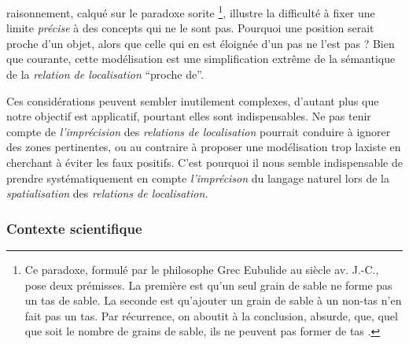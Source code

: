 raisonnement, calqué sur le paradoxe sorite \footnote{Ce paradoxe,
  formulé par le philosophe Grec Eubulide au  siècle
  av. J.-C., pose deux prémisses. La première est qu'un seul grain de
  sable ne forme pas un tas de sable. La seconde est qu'ajouter un
  grain de sable à un non-tas n'en fait pas un tas. Par récurrence, on
  aboutit à la conclusion, absurde, que, quel que soit le nombre de
  grains de sable, ils ne peuvent pas former de tas
  \autocite{Sorensen2018,Hyde2018}.}, illustre la difficulté à fixer
une limite \emph{précise} à des concepts qui ne le sont pas. Pourquoi
une position serait proche d'un objet, alors que celle qui en est
éloignée d'un pas ne l'est pas ? Bien que courante, cette modélisation
est une simplification extrême de la sémantique de la \emph{relation
  de localisation} \enquote{proche de}.

Ces considérations peuvent sembler inutilement complexes, d'autant
plus que notre objectif est applicatif, pourtant elles sont
indispensables. Ne pas tenir compte de \emph{l'imprécision} des
\emph{relations de localisation} pourrait conduire à ignorer des zones
pertinentes, ou au contraire à proposer une modélisation trop laxiste
en cherchant à éviter les faux positifs. C'est pourquoi il nous semble
indispensable de prendre systématiquement en compte
\emph{l'imprécison} du langage naturel lors de la
\emph{spatialisation} des \emph{relations de localisation.}

\subsubsection{Contexte scientifique}

